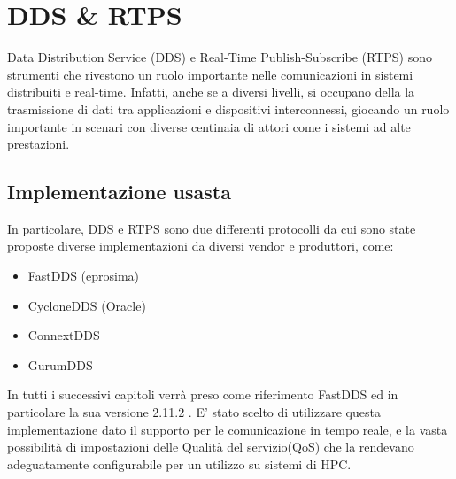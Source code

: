 \chapter{DDS \& RTPS}\label{Chapter:dds}
Data Distribution Service (DDS)\cite{DDS} e Real-Time Publish-Subscribe (RTPS)\cite{RTPS} sono strumenti che rivestono un ruolo importante nelle comunicazioni in sistemi distribuiti e real-time. Infatti, anche se a diversi livelli, si occupano della la trasmissione di dati tra applicazioni e dispositivi interconnessi, giocando un ruolo importante in scenari con diverse centinaia di attori come i sistemi ad alte prestazioni. 


\section{Implementazione usasta}
In particolare, DDS e RTPS sono due differenti protocolli da cui sono state proposte diverse implementazioni da diversi vendor e produttori, come:
\begin{itemize}
  \item FastDDS (eprosima)
  \item CycloneDDS (Oracle)
  \item ConnextDDS
  \item GurumDDS
\end{itemize}

In tutti i successivi capitoli verrà preso come riferimento FastDDS ed in particolare la sua versione 2.11.2 \cite{FastDDS}. E' stato scelto di utilizzare questa implementazione dato il supporto per le comunicazione in tempo reale, e la vasta possibilità di impostazioni delle Qualità del servizio(QoS) che la rendevano adeguatamente configurabile per un utilizzo su sistemi di HPC.


